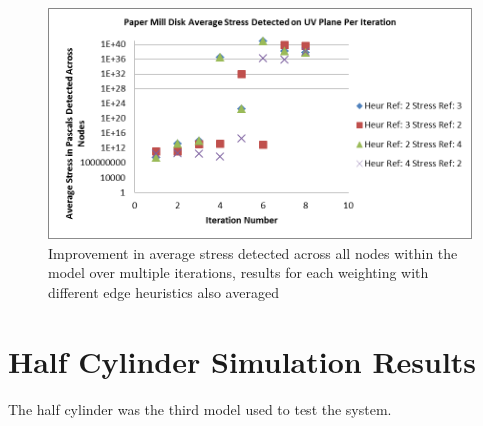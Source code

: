  \begin{figure}[H]
  \centerline{\includegraphics[width=120mm, scale=0.5]{../Graphics/Graphs/PaperMillAverageStressRevealed.png}}
  \caption{Improvement in average stress detected across all nodes within the model over multiple iterations, results for each weighting with different edge heuristics also averaged}
\end{figure}


\section{Half Cylinder Simulation Results}
The half cylinder was the third model used to test the system. 




